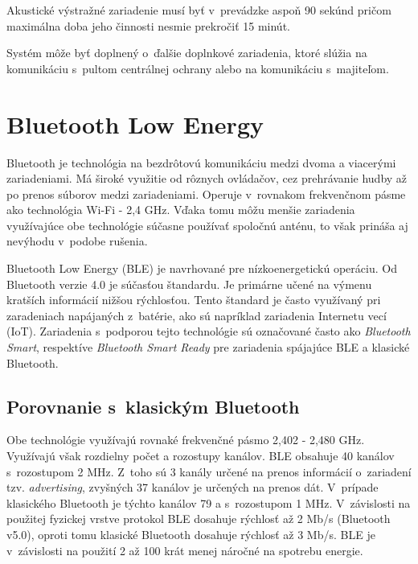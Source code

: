 Akustické výstražné zariadenie musí byť v~prevádzke aspoň 90 sekúnd pričom maximálna doba jeho činnosti nesmie prekročiť 15 minút.\cite{csn-en-50131-1}

Systém môže byť doplnený o~ďalšie doplnkové zariadenia, ktoré slúžia na komunikáciu s~pultom centrálnej ochrany alebo na komunikáciu s~majiteľom.\cite{Krecek}


\chapter{Bluetooth Low Energy}

Bluetooth je technológia na bezdrôtovú komunikáciu medzi dvoma a viacerými zariadeniami. Má široké využitie od rôznych ovládačov, cez prehrávanie hudby až po prenos súborov medzi zariadeniami. Operuje v~rovnakom frekvenčnom pásme ako technológia Wi-Fi - 2,4 GHz. Vďaka tomu môžu menšie zariadenia využívajúce obe technológie súčasne používať spoločnú anténu, to však prináša aj nevýhodu v~podobe rušenia.

Bluetooth Low Energy (BLE) je navrhované pre nízkoenergetickú operáciu. Od Bluetooth verzie 4.0 je súčasťou štandardu. Je primárne učené na výmenu kratších informácií nižšou rýchlosťou. Tento štandard je často využívaný pri zaradeniach napájaných z~batérie, ako sú napríklad zariadenia Internetu vecí (IoT). Zariadenia s~podporou tejto technológie sú označované často ako \textit{Bluetooth Smart}, respektíve \textit{Bluetooth Smart Ready} pre zariadenia spájajúce BLE a klasické Bluetooth.

\section{Porovnanie s~klasickým Bluetooth}

Obe technológie využívajú rovnaké frekvenčné pásmo 2,402 - 2,480 GHz. Využívajú však rozdielny počet a rozostupy kanálov. BLE obsahuje 40 kanálov s~rozostupom 2 MHz. Z~toho sú 3 kanály určené na prenos informácií o~zariadení tzv. \textit{advertising}, zvyšných 37 kanálov je určených na prenos dát. V~prípade klasického Bluetooth je týchto kanálov 79 a s~rozostupom 1 MHz. V~závislosti na použitej fyzickej vrstve protokol BLE dosahuje rýchlosť až 2 Mb/s (Bluetooth v5.0), oproti tomu klasické Bluetooth dosahuje rýchlosť až 3 Mb/s. BLE je v~závislosti na použití 2 až 100 krát menej náročné na spotrebu energie.
\cite{bluetooth}

